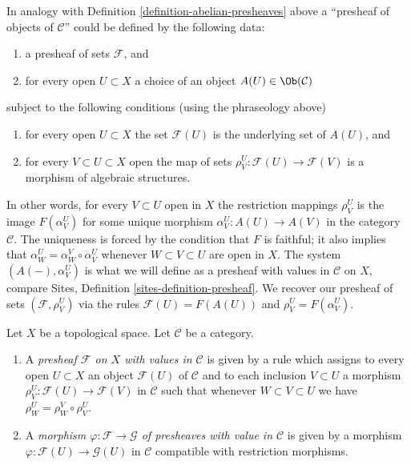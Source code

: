 \medskip\noindent
In analogy with Definition \ref{definition-abelian-presheaves}
above a ``presheaf of objects of $\mathcal{C}$'' could be
defined by the following data:
\begin{enumerate}
\item a presheaf of sets $\mathcal{F}$, and
\item for every open $U \subset X$ a choice
of an object $A(U) \in \Ob(\mathcal{C})$
\end{enumerate}
subject to the following conditions (using the phraseology above)
\begin{enumerate}
\item for every open $U \subset X$ the set $\mathcal{F}(U)$
is the underlying set of $A(U)$, and
\item for every $V \subset U \subset X$ open
the map of sets $\rho_V^U: \mathcal{F}(U) \to \mathcal{F}(V)$
is a morphism of algebraic structures.
\end{enumerate}
In other words, for every $V \subset U$ open in $X$
the restriction mappings $\rho^U_V$ is the image
$F(\alpha^U_V)$ for some unique morphism
$\alpha^U_V : A(U) \to A(V)$ in the category $\mathcal{C}$.
The uniqueness is forced by the condition that $F$ is
faithful; it also implies that
$\alpha^U_W = \alpha^V_W \circ \alpha^U_V$
whenever $W \subset V \subset U$ are open in $X$.
The system $(A(-), \alpha^U_V)$ is what we will define as a
presheaf with values in $\mathcal{C}$ on $X$, compare
Sites, Definition \ref{sites-definition-presheaf}.
We recover our presheaf of sets $(\mathcal{F}, \rho_V^U)$
via the rules $\mathcal{F}(U) = F(A(U))$ and
$\rho_V^U = F(\alpha_V^U)$.

\begin{definition}
\label{definition-presheaf-values-in-category}
Let $X$ be a topological space.
Let $\mathcal{C}$ be a category.
\begin{enumerate}
\item A {\it presheaf $\mathcal{F}$ on $X$ with values in $\mathcal{C}$}
is given by a rule which assigns to every open $U \subset X$
an object $\mathcal{F}(U)$ of $\mathcal{C}$
and to each inclusion $V \subset U$
a morphism $\rho_V^U : \mathcal{F}(U) \to \mathcal{F}(V)$
in $\mathcal{C}$ such that whenever $W \subset V \subset U$
we have $\rho_W^U = \rho_W^V \circ \rho_V^U$.
\item A {\it morphism $\varphi : \mathcal{F} \to \mathcal{G}$
of presheaves with value in $\mathcal{C}$} is given by a
morphism $\varphi : \mathcal{F}(U) \to \mathcal{G}(U)$
in $\mathcal{C}$ compatible with restriction morphisms.
\end{enumerate}
\end{definition}

